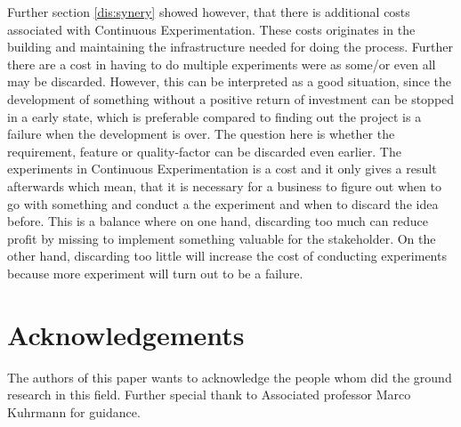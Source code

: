 \documentclass{sig-alternate}
\begin{document}
Further section \ref{dis:synery} showed however, that there is additional costs associated with Continuous Experimentation. These costs originates in the building and maintaining the infrastructure needed for doing the process. Further there are a cost in having to do multiple experiments were as some/or even all may be discarded. However, this can be interpreted as a good situation, since the development of something without a positive return of investment can be stopped in a early state, which is preferable compared to finding out the project is a failure when the development is over. The question here is whether the requirement, feature or quality-factor can be discarded even earlier. The experiments in Continuous Experimentation is a cost and it only gives a result afterwards which mean, that it is necessary for a business to figure out when to go with something and conduct a the experiment and when to discard the idea before. This is a balance where on one hand, discarding too much can reduce profit by missing to implement something valuable for the stakeholder. On the other hand, discarding too little will increase the cost of conducting experiments because more experiment will turn out to be a failure. 
 



\section{Acknowledgements}
The authors of this paper wants to acknowledge the people whom did the ground research in this field. Further special thank to Associated professor Marco Kuhrmann for guidance. 
%

%
%
\end{document}
